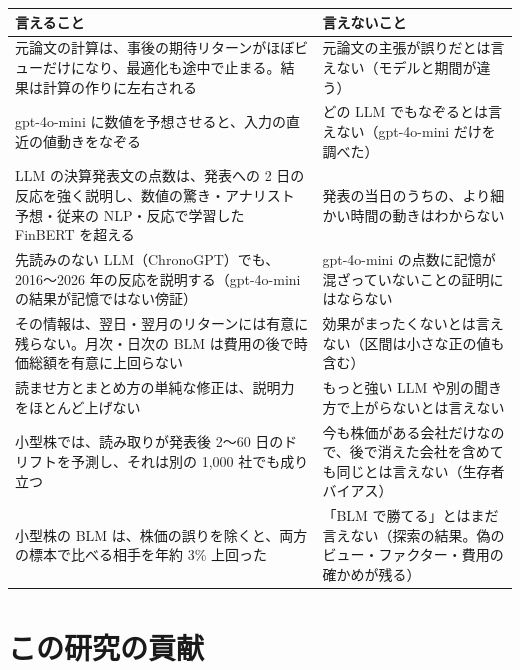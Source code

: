 \begin{longtable}{P{7.2cm}P{7.2cm}}
\toprule
\textbf{言えること} & \textbf{言えないこと} \\
\midrule
\endhead
\bottomrule
\endfoot
元論文の計算は、事後の期待リターンがほぼビューだけになり、最適化も途中で止まる。結果は計算の作りに左右される & 元論文の主張が誤りだとは言えない（モデルと期間が違う） \\
gpt-4o-mini に数値を予想させると、入力の直近の値動きをなぞる & どの LLM でもなぞるとは言えない（gpt-4o-mini だけを調べた） \\
LLM の決算発表文の点数は、発表への 2 日の反応を強く説明し、数値の驚き・アナリスト予想・従来の NLP・反応で学習した FinBERT を超える & 発表の当日のうちの、より細かい時間の動きはわからない \\
先読みのない LLM（ChronoGPT）でも、2016〜2026 年の反応を説明する（gpt-4o-mini の結果が記憶ではない傍証） & gpt-4o-mini の点数に記憶が混ざっていないことの証明にはならない \\
その情報は、翌日・翌月のリターンには有意に残らない。月次・日次の BLM は費用の後で時価総額を有意に上回らない & 効果がまったくないとは言えない（区間は小さな正の値も含む） \\
読ませ方とまとめ方の単純な修正は、説明力をほとんど上げない & もっと強い LLM や別の聞き方で上がらないとは言えない \\
小型株では、読み取りが発表後 2〜60 日のドリフトを予測し、それは別の 1,000 社でも成り立つ & 今も株価がある会社だけなので、後で消えた会社を含めても同じとは言えない（生存者バイアス） \\
小型株の BLM は、株価の誤りを除くと、両方の標本で比べる相手を年約 3\% 上回った & 「BLM で勝てる」とはまだ言えない（探索の結果。偽のビュー・ファクター・費用の確かめが残る） \\
\end{longtable}

\section{この研究の貢献}

